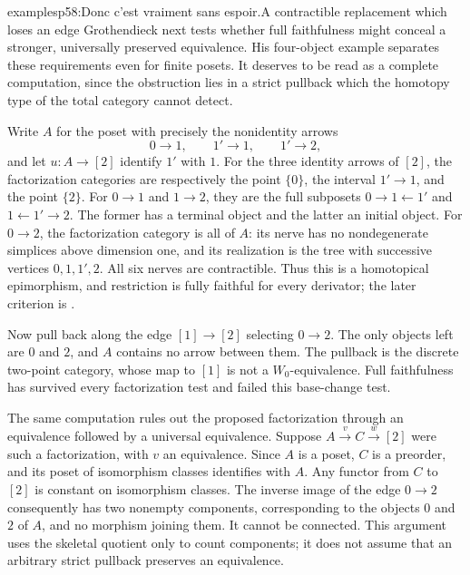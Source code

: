 \begin{dcomment}{examples}{p58:Donc c'est vraiment sans espoir.}{A contractible replacement which loses an edge}
Grothendieck next tests whether full faithfulness might conceal a stronger, universally preserved equivalence. His four-object example separates these requirements even for finite posets. It deserves to be read as a complete computation, since the obstruction lies in a strict pullback which the homotopy type of the total category cannot detect.

Write $A$ for the poset with precisely the nonidentity arrows
\[
 0\longrightarrow 1,\qquad 1'\longrightarrow1,
 \qquad 1'\longrightarrow2,
\]
and let $u:A\to[2]$ identify $1'$ with $1$. For the three identity arrows of $[2]$, the factorization categories are respectively the point $\{0\}$, the interval $1'\to1$, and the point $\{2\}$. For $0\to1$ and $1\to2$, they are the full subposets $0\to1\leftarrow1'$ and $1\leftarrow1'\to2$. The former has a terminal object and the latter an initial object. For $0\to2$, the factorization category is all of $A$: its nerve has no nondegenerate simplices above dimension one, and its realization is the tree with successive vertices $0,1,1',2$. All six nerves are contractible. Thus this is a homotopical epimorphism, and restriction is fully faithful for every derivator; the later criterion is \citet[Theorem 6.10]{GrothStovicek2016Trees}.

Now pull back along the edge $[1]\to[2]$ selecting $0\to2$. The only objects left are $0$ and $2$, and $A$ contains no arrow between them. The pullback is the discrete two-point category, whose map to $[1]$ is not a $W_0$-equivalence. Full faithfulness has survived every factorization test and failed this base-change test.

The same computation rules out the proposed factorization through an equivalence followed by a universal equivalence. Suppose $A\xrightarrow{v}C\xrightarrow{w}[2]$ were such a factorization, with $v$ an equivalence. Since $A$ is a poset, $C$ is a preorder, and its poset of isomorphism classes identifies with $A$. Any functor from $C$ to $[2]$ is constant on isomorphism classes. The inverse image of the edge $0\to2$ consequently has two nonempty components, corresponding to the objects $0$ and $2$ of $A$, and no morphism joining them. It cannot be connected. This argument uses the skeletal quotient only to count components; it does not assume that an arbitrary strict pullback preserves an equivalence.
\end{dcomment}

